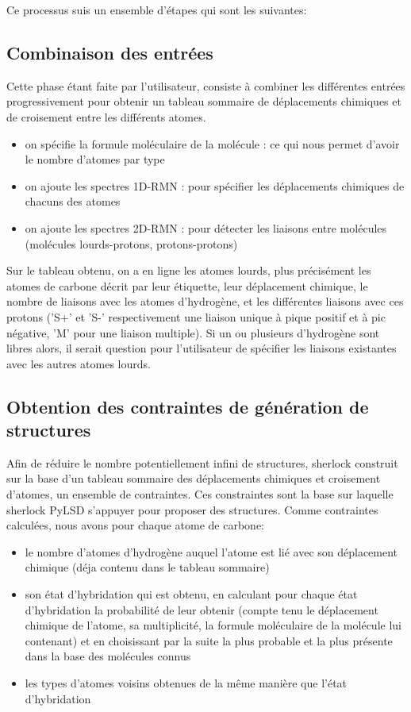 \documentclass[12pt, french, latin.medieval, a4paper]{report}
\begin{document}
    Ce processus suis un ensemble d'étapes qui sont les suivantes:
    
   	 \subsection{Combinaison des entrées}
   	 Cette phase étant faite par l'utilisateur, consiste à combiner les différentes entrées progressivement pour obtenir un tableau sommaire
   	 de déplacements chimiques et de croisement entre les différents atomes.
   	 \begin{itemize}
   		 \item on spécifie la formule moléculaire de la molécule : ce qui nous permet d'avoir le nombre d'atomes par type
   		 \item on ajoute les spectres 1D-RMN : pour spécifier les déplacements chimiques de chacuns des atomes
   		 \item on ajoute les spectres 2D-RMN : pour détecter les liaisons entre molécules (molécules lourds-protons, protons-protons)
   	 \end{itemize}
     
   	 Sur le tableau obtenu, on a en ligne les atomes lourds, plus précisément les atomes de carbone décrit par leur étiquette, leur déplacement chimique, le nombre de liaisons avec les atomes d'hydrogène, et les différentes liaisons avec ces protons ('S+' et 'S-' respectivement une liaison unique à pique positif et à pic négative, 'M' pour une liaison multiple).
   	 Si un ou plusieurs d'hydrogène sont libres alors, il serait question pour l'utilisateur de spécifier les liaisons existantes avec les autres atomes lourds.
    
   	 \subsection{Obtention des contraintes de génération de structures}
   	 Afin de réduire le nombre potentiellement infini de structures, sherlock construit sur la base d'un tableau sommaire des déplacements chimiques et croisement d'atomes, un ensemble de contraintes. Ces constraintes sont la base sur laquelle sherlock PyLSD s'appuyer pour proposer des structures.
   	 Comme contraintes calculées, nous avons pour chaque atome de carbone:
   	 \begin{itemize}
   		 \item le nombre d'atomes d'hydrogène auquel l'atome est lié avec son déplacement chimique (déja contenu dans le tableau sommaire)
   		 \item son état d'hybridation qui est obtenu, en calculant pour chaque état d'hybridation la probabilité de leur obtenir (compte tenu le déplacement chimique de l'atome, sa multiplicité, la formule moléculaire de la molécule lui contenant) et en choisissant par la suite la plus probable et la plus présente dans la base des molécules connus
   		 \item les types d'atomes voisins obtenues de la même manière que l'état d'hybridation
   	 \end{itemize}
  	 
\end{document}
